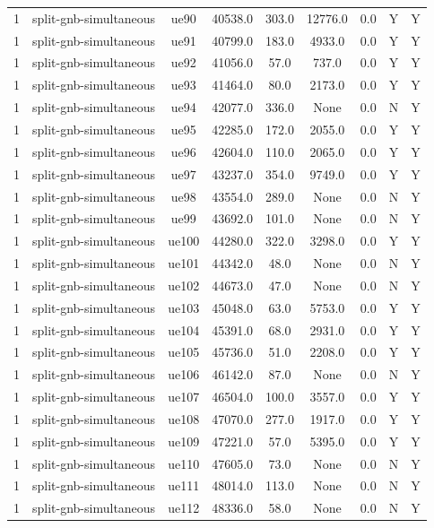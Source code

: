 \begin{table}[ht]
\begin{tabular}{|c|c|c|c|c|c|c|c|c|}
1 & split-gnb-simultaneous & ue90 & 40538.0 & 303.0 & 12776.0 & 0.0 & Y & Y \\
1 & split-gnb-simultaneous & ue91 & 40799.0 & 183.0 & 4933.0 & 0.0 & Y & Y \\
1 & split-gnb-simultaneous & ue92 & 41056.0 & 57.0 & 737.0 & 0.0 & Y & Y \\
1 & split-gnb-simultaneous & ue93 & 41464.0 & 80.0 & 2173.0 & 0.0 & Y & Y \\
1 & split-gnb-simultaneous & ue94 & 42077.0 & 336.0 & None & 0.0 & N & Y \\
1 & split-gnb-simultaneous & ue95 & 42285.0 & 172.0 & 2055.0 & 0.0 & Y & Y \\
1 & split-gnb-simultaneous & ue96 & 42604.0 & 110.0 & 2065.0 & 0.0 & Y & Y \\
1 & split-gnb-simultaneous & ue97 & 43237.0 & 354.0 & 9749.0 & 0.0 & Y & Y \\
1 & split-gnb-simultaneous & ue98 & 43554.0 & 289.0 & None & 0.0 & N & Y \\
1 & split-gnb-simultaneous & ue99 & 43692.0 & 101.0 & None & 0.0 & N & Y \\
1 & split-gnb-simultaneous & ue100 & 44280.0 & 322.0 & 3298.0 & 0.0 & Y & Y \\
1 & split-gnb-simultaneous & ue101 & 44342.0 & 48.0 & None & 0.0 & N & Y \\
1 & split-gnb-simultaneous & ue102 & 44673.0 & 47.0 & None & 0.0 & N & Y \\
1 & split-gnb-simultaneous & ue103 & 45048.0 & 63.0 & 5753.0 & 0.0 & Y & Y \\
1 & split-gnb-simultaneous & ue104 & 45391.0 & 68.0 & 2931.0 & 0.0 & Y & Y \\
1 & split-gnb-simultaneous & ue105 & 45736.0 & 51.0 & 2208.0 & 0.0 & Y & Y \\
1 & split-gnb-simultaneous & ue106 & 46142.0 & 87.0 & None & 0.0 & N & Y \\
1 & split-gnb-simultaneous & ue107 & 46504.0 & 100.0 & 3557.0 & 0.0 & Y & Y \\
1 & split-gnb-simultaneous & ue108 & 47070.0 & 277.0 & 1917.0 & 0.0 & Y & Y \\
1 & split-gnb-simultaneous & ue109 & 47221.0 & 57.0 & 5395.0 & 0.0 & Y & Y \\
1 & split-gnb-simultaneous & ue110 & 47605.0 & 73.0 & None & 0.0 & N & Y \\
1 & split-gnb-simultaneous & ue111 & 48014.0 & 113.0 & None & 0.0 & N & Y \\
1 & split-gnb-simultaneous & ue112 & 48336.0 & 58.0 & None & 0.0 & N & Y \\

\end{tabular}
\end{table}
